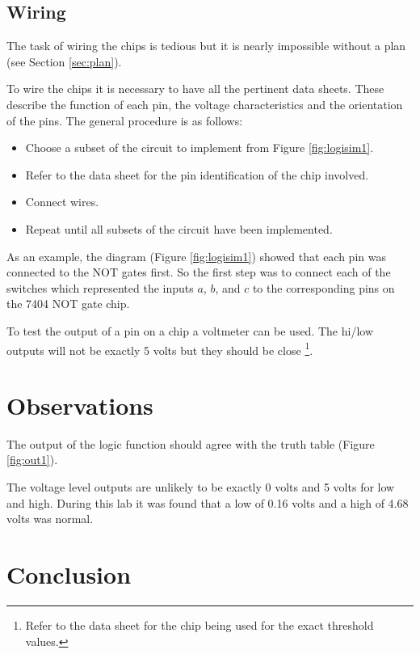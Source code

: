 \documentclass[12pt]{article}
\begin{document}
\subsection{Wiring}

The task of wiring the chips is tedious but it is nearly impossible
without a plan (see Section \ref{sec:plan}).

To wire the chips it is necessary to have all the pertinent data sheets.
These describe the function of each pin, the voltage characteristics and
the orientation of the pins.
The general procedure is as follows:
\begin{itemize}
	\item Choose a subset of the circuit to implement from Figure \ref{fig:logisim1}.
	\item Refer to the data sheet for the pin identification of the chip involved.
	\item Connect wires.
	\item Repeat until all subsets of the circuit have been implemented.
\end{itemize}

As an example, the diagram (Figure \ref{fig:logisim1}) showed that
each pin was connected to the NOT gates first.
So the first step was to connect each of the switches which represented
the inputs $a$, $b$, and $c$ to the corresponding pins on the 7404 NOT gate chip.

To test the output of a pin on a chip a voltmeter can be used.
The hi/low outputs will not be exactly 5 volts but they should be close
\footnote{Refer to the data sheet for the chip being used for the exact
threshold values.}.


\section{Observations}

The output of the logic function should agree with the truth table
(Figure \ref{fig:out1}).

The voltage level outputs are unlikely to be exactly 0 volts and
5 volts for low and high.
During this lab it was found that a low
of 0.16 volts and a high of 4.68 volts was normal.

\clearpage
\section{Conclusion}
\end{document}
